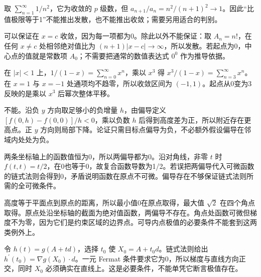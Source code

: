 \documentclass[UTF8,12pt,a4paper,fontset=fandol]{ctexart}
\begin{document}
\begin{solve}\label{ans:c45q12}
取 $\sum_{n=1}^\infty1/n^2$，它为收敛的 $p$ 级数，但 $a_{n+1}/a_n=n^2/(n+1)^2\to1$。因此“比值极限等于1”不能推出发散，也不能推出收敛；需要另用适合的判别。
\end{solve}

\begin{solve}\label{ans:c45q13}
可以保证在 $x=c$ 收敛，因为每一项都为0。除此以外不能保证：取 $A_n=n!$，在任何 $x\ne c$ 处相邻绝对值比为 $(n+1)|x-c|\to\infty$，所以发散。若起点为0，中心点的值就是常数项 $A_0$；不需要把通常的数值表达式 $0^0$ 作为推导依据。
\end{solve}

\begin{solve}\label{ans:c45q14}
在 $|x|<1$ 上，$1/(1-x)=\sum_{n=0}^\infty x^n$，乘以 $x^3$ 得 $x^3/(1-x)=\sum_{n=3}^\infty x^n$。在 $x=1$ 与 $x=-1$ 处通项均不趋零，所以收敛区间为 $(-1,1)$。起点从0变为3反映的是乘以 $x^3$ 后幂次整体平移。
\end{solve}

\begin{solve}\label{ans:c45q15}
不能。沿负 $y$ 方向取足够小的负增量 $h$，由偏导定义 $[f(0,h)-f(0,0)]/h<0$，乘以负数 $h$ 后得到高度差为正，所以附近存在更高点。正 $y$ 方向则局部下降。论证只需目标点偏导为负，不必额外假设偏导在邻域内处处为负。
\end{solve}

\begin{solve}\label{ans:c45q16}
两条坐标轴上的函数值恒为0，所以两偏导都为0。沿对角线，非零 $t$ 时 $f(t,t)=t/2$，在0也等于0，故复合函数导数为1/2。若误把两偏导代入可微函数的链式法则会得到0，矛盾说明函数在原点不可微。偏导存在不够保证链式法则所需的全可微条件。
\end{solve}

\begin{solve}\label{ans:c45q17}
高度等于平面点到原点的距离，所以最小值0在原点取得，最大值 $\sqrt2$ 在四个角点取得。原点处沿坐标轴的截面为绝对值函数，两偏导不存在。角点处函数可微但梯度不为零，因为它们是约束区域的边界点。可导内点极值的必要条件不能套到这两类例外上。
\end{solve}

\begin{solve}\label{ans:c45q18}
令 $h(t)=g(A+td)$，选择 $t_0$ 使 $X_0=A+t_0d$。链式法则给出 $h^{\prime}(t_0)=\nabla g(X_0)\cdot d$。一元 Fermat 条件要求它为0，所以梯度与直线方向正交，同时 $X_0$ 必须确实在直线上。这是必要条件，不能单凭它断言极值存在。
\end{solve}
\end{document}
